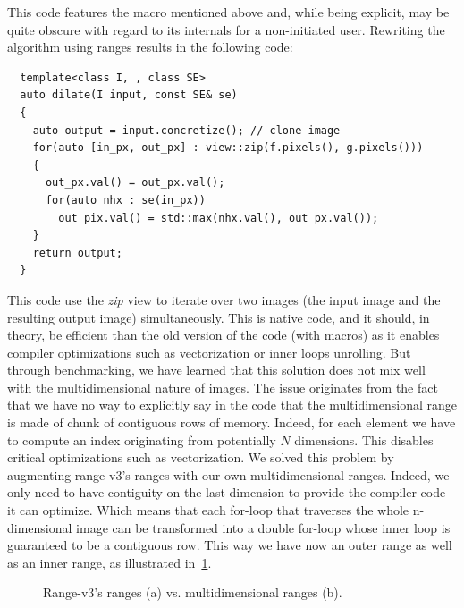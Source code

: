 This code features the macro mentioned above and, while being explicit, may be quite obscure with regard to its
internals for a non-initiated user. Rewriting the algorithm using ranges results in the following code:
\begin{verbatim}
  template<class I, , class SE>
  auto dilate(I input, const SE& se)
  {
    auto output = input.concretize(); // clone image
    for(auto [in_px, out_px] : view::zip(f.pixels(), g.pixels()))
    {
      out_px.val() = out_px.val();
      for(auto nhx : se(in_px))
        out_pix.val() = std::max(nhx.val(), out_px.val());
    }
    return output;
  }
\end{verbatim}
This code use the \emph{zip} view to iterate over two images (the input image and the resulting output image)
simultaneously. This is native code, and it should, in theory, be efficient than the old version of the code (with
macros) as it enables compiler optimizations such as vectorization or inner loops unrolling. But through benchmarking,
we have learned that this solution does not mix well~\parencite{austern.2000.segmented} with the multidimensional nature
of images. The issue originates from the fact that we have no way to explicitly say in the code that the
multidimensional range is made of chunk of contiguous rows of memory. Indeed, for each element we have to compute an
index originating from potentially $N$ dimensions. This disables critical optimizations such as vectorization. We solved
this problem by augmenting range-v3's ranges with our own multidimensional ranges. Indeed, we only need to have
contiguity on the last dimension to provide the compiler code it can optimize. Which means that each for-loop that
traverses the whole n-dimensional image can be transformed into a double for-loop whose inner loop is guaranteed to be a
contiguous row. This way we have now an outer range as well as an inner range, as illustrated
in~\cref{fig.inner.outer.range}.

\begin{figure}[htbp]
  \centering
  \caption{Range-v3's ranges (a) vs. multidimensional ranges (b).}
  \label{fig.inner.outer.range}
\end{figure}

